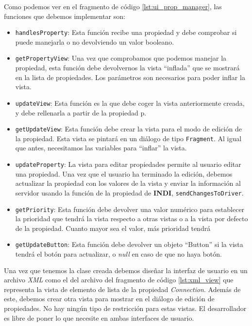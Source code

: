\bigskip
Como podemos ver en el fragmento de código \ref{lst:ui_prop_manager}, las funciones que debemos implementar son:

\begin{itemize}
  \item \texttt{handlesProperty}:
  Esta función recibe una propiedad y debe comprobar si puede manejarla o no devolviendo un valor booleano.

  \item \texttt{getPropertyView}:
  Una vez que comprobamos que podemos manejar la propiedad, esta función debe devolvernos la vista ``inflada'' que se mostrará en la lista de propiedades. Los parámetros  son necesarios para poder inflar la vista.

  \item \texttt{updateView}:
  Esta función es la que debe coger la vista anteriormente creada, y debe rellenarla a partir de la propiedad p.

  \item \texttt{getUpdateView}:
  Esta función debe crear la vista para el modo de edición de la propiedad. Esta vista se pintará en un diálogo de tipo \texttt{Fragment}. Al igual que antes, necesitamos las variables  para ``inflar'' la vista.

  \item \texttt{updateProperty}:
  La vista para editar propiedades permite al usuario editar una propiedad. Una vez que el usuario ha terminado la edición, debemos actualizar la propiedad con los valores de la vista y enviar la información al servidor usando la función de la propiedad de \textbf{INDI}, \texttt{sendChangesToDriver}. 

  \item \texttt{getPriority}:
  Esta función debe devolver una valor numérico para establecer la prioridad que tendrá la vista respecto a otras vistas o a la vista por defecto de la propiedad. Cuanto mayor sea el valor, más prioridad tendrá

  \item \texttt{getUpdateButton}:
  Esta función debe devolver un objeto ``Button'' si la vista tendrá el botón para actualizar, o \textit{null} en caso de que no haya botón.
\end{itemize}

\bigskip
Una vez que tenemos la clase creada debemos diseñar la interfaz de usuario en un archivo \textit{XML} como el del archivo del fragmento de código \ref{lst:xml_view} que representa la vista de elemento de lista de la propiedad \textit{Connection}. Además de este, debemos crear otra vista para mostrar en el diálogo de edición de propiedades. No hay ningún tipo de restricción para estas vistas. El desarrollador es libre de poner lo que necesite en ambas interfaces de usuario.

